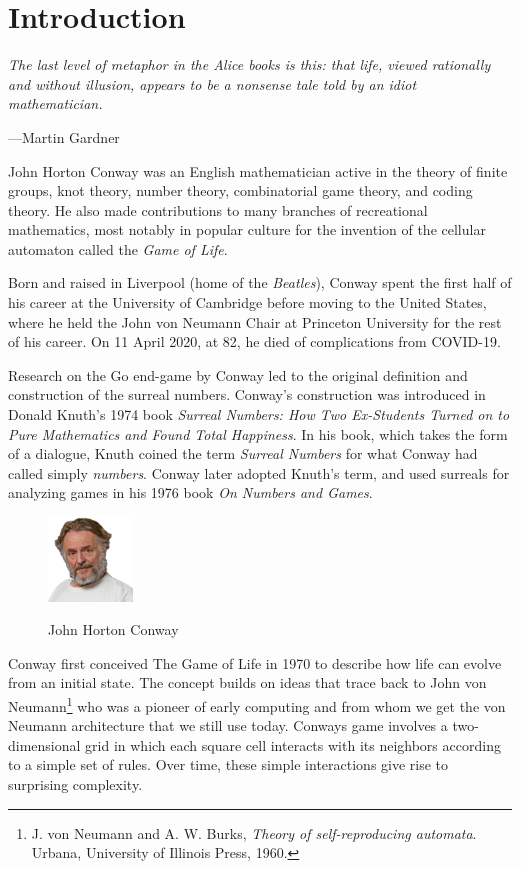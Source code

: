\section{Introduction}

\textwidth
\epigraph{\emph{The last level of metaphor in the Alice books is this: that
life, viewed rationally and without illusion, appears to be a nonsense tale told
by an idiot mathematician.}}{ ---Martin Gardner}

John Horton Conway was an English mathematician active in the theory of finite
groups, knot theory, number theory, combinatorial game theory, and coding
theory. He also made contributions to many branches of recreational mathematics,
most notably in popular culture for the invention of the cellular automaton
called the \emph{Game of Life}.

Born and raised in Liverpool (home of the \emph{Beatles}), Conway spent the
first half of his career at the University of Cambridge before moving to the
United States, where he held the John von Neumann Chair at Princeton University
for the rest of his career. On 11 April 2020, at 82, he died of complications
from COVID-19.

Research on the Go end-game by Conway led to the original definition and
construction of the surreal numbers. Conway's construction was introduced in
Donald Knuth's 1974 book \emph{Surreal Numbers: How Two Ex-Students Turned on to
Pure Mathematics and Found Total Happiness}. In his book, which takes the form
of a dialogue, Knuth coined the term \emph{Surreal Numbers} for what Conway had
called simply \emph{numbers}. Conway later adopted Knuth's term, and used
surreals for analyzing games in his 1976 book \emph{On Numbers and Games}.

\begin{figure}
  \includegraphics[width=0.2\textwidth]{images/CK.png}
  \centerline{\small John Horton Conway}
\end{figure}

Conway first conceived The Game of Life in 1970 to describe how life can evolve
from an initial state. The concept builds on ideas that trace back to John von
Neumann\footnote{J. von Neumann and A. W. Burks, \emph{Theory of
self-reproducing automata}. Urbana, University of Illinois Press, 1960.} who was
a pioneer of early computing and from whom we get the von Neumann architecture
that we still use today.  Conways game involves a two-dimensional grid in which
each square cell interacts with its neighbors according to a simple set of
rules. Over time, these simple interactions give rise to surprising complexity.

